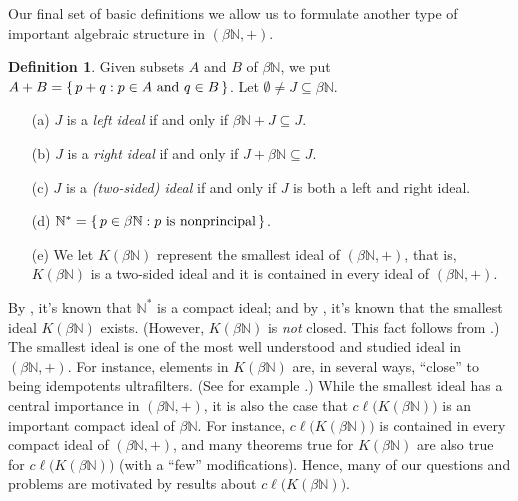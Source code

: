 \documentclass[12pt]{article}
\theoremstyle{plain}
\theoremstyle{definition}
\newtheorem{defn}[thm]{Definition}
\newcommand{\bbN}{\mathbb{N}}
\begin{document}
Our final set of basic definitions we allow us to formulate another type
of important algebraic structure in $(\beta\bbN, +)$. 
\begin{defn}
  Given subsets $A$ and $B$ of $\beta\bbN$, we put $A + B = \{\, p+q :
  \hbox{$p \in A$ and $q \in B$} \,\}$.
  Let $\emptyset \ne J \subseteq \beta\bbN$.
  \begin{itemize}
    \item[(a)] $J$ is a \textsl{left ideal} if and only if
      $\beta\bbN + J \subseteq J$.
    \item[(b)] $J$ is a \textsl{right ideal} if and only if
      $J+\beta\bbN \subseteq J$.
    \item[(c)] $J$ is a \textsl{(two-sided) ideal} if and only if
      $J$ is both a left and right ideal.
    \item[(d)] $\bbN^* = \{\, p \in \beta\bbN : \hbox{$p$ is
        nonprincipal} \,\}$.
    \item[(e)] We let $K(\beta\bbN)$ represent the smallest ideal of
      $(\beta\bbN, +)$, that is, $K(\beta\bbN)$ is a two-sided ideal
      and it is contained in every ideal of $(\beta\bbN, +)$.
  \end{itemize}
\end{defn}

By \cite[Theorem 4.36]{Hindman:1998fk}, it's known that $\bbN^*$ is a
compact ideal; and by \cite[Theorem 2.8]{Hindman:1998fk}, it's known
that the smallest ideal $K(\beta\bbN)$ exists. 
(However, $K(\beta\bbN)$ is \textsl{not} closed. 
This fact follows from \cite[Theorem 4.4]{Hindman:1996uq}.)
The smallest ideal is one of the most well understood and studied
ideal in $(\beta\bbN, +)$.
For instance, elements in $K(\beta\bbN)$ are, in several ways,
``close'' to being idempotents ultrafilters. 
(See for example \cite[Theorems 4.39 and 4.43]{Hindman:1998fk}.)
While the smallest ideal has a central importance in $(\beta\bbN, +)$,
it is also the case that $c\ell\bigl(K(\beta\bbN)\bigr)$ is an
important compact ideal of $\beta\bbN$. 
For instance, $c\ell\bigl(K(\beta\bbN)\bigr)$ is contained in every
compact ideal of $(\beta\bbN, +)$, and many theorems true for
$K(\beta\bbN)$ are also true for $c\ell\bigl(K(\beta\bbN)\bigr)$ (with
a ``few'' modifications). 
Hence, many of our questions and problems are motivated by results
about $c\ell\bigl(K(\beta\bbN)\bigr)$.
\end{document}

